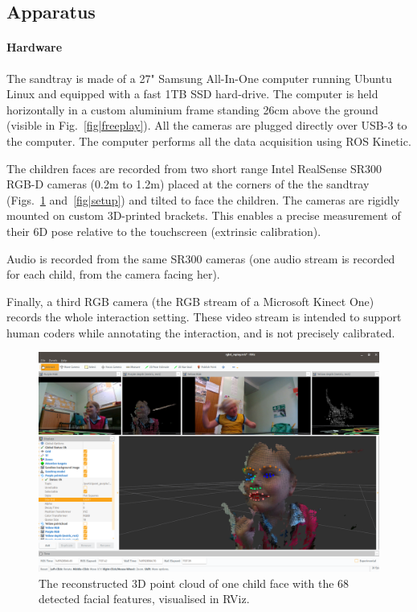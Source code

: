 \documentclass{article}
\begin{document}
\subsection{Apparatus}

\paragraph{Hardware}
The sandtray is made of a 27" Samsung All-In-One computer running Ubuntu Linux
and equipped with a fast 1TB SSD hard-drive. The computer is held horizontally in
a custom aluminium frame standing 26cm above the ground
(visible in Fig.~\ref{fig|freeplay}). All the cameras are plugged directly over
USB-3 to the computer. The computer performs all the data acquisition using ROS
Kinetic.

The children faces are recorded from two short range Intel RealSense SR300
RGB-D cameras (0.2m to 1.2m) placed at the corners of the the sandtray
(Figs.~\ref{fig|rviz} and~\ref{fig|setup}) and tilted to face the children. The
cameras are rigidly mounted on custom 3D-printed brackets. This enables a
precise measurement of their 6D pose relative to the touchscreen (extrinsic
calibration).

Audio is recorded from the same SR300 cameras (one audio stream is recorded for
each child, from the camera facing her).

Finally, a third RGB camera (the RGB stream of a Microsoft Kinect One) records
the whole interaction setting. These video stream is intended to support human
coders while annotating the interaction, and is not precisely calibrated.

\begin{figure}[ht!]
    \centering
    \includegraphics[width=0.9\linewidth]{3d-point-cloud-facial-features}
    \caption{The reconstructed 3D point cloud of one child face with the
    68 detected facial features, visualised in RViz.}

    \label{fig|rviz}
\end{figure}
\end{document}
